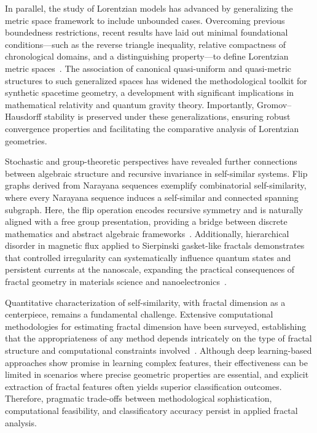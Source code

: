 \documentclass[sigconf]{acmart}
\begin{document}
In parallel, the study of Lorentzian models has advanced by generalizing the metric space framework to include unbounded cases. Overcoming previous boundedness restrictions, recent results have laid out minimal foundational conditions—such as the reverse triangle inequality, relative compactness of chronological domains, and a distinguishing property—to define Lorentzian metric spaces~\cite{ref51}. The association of canonical quasi-uniform and quasi-metric structures to such generalized spaces has widened the methodological toolkit for synthetic spacetime geometry, a development with significant implications in mathematical relativity and quantum gravity theory. Importantly, Gromov--Hausdorff stability is preserved under these generalizations, ensuring robust convergence properties and facilitating the comparative analysis of Lorentzian geometries.

Stochastic and group-theoretic perspectives have revealed further connections between algebraic structure and recursive invariance in self-similar systems. Flip graphs derived from Narayana sequences exemplify combinatorial self-similarity, where every Narayana sequence induces a self-similar and connected spanning subgraph. Here, the flip operation encodes recursive symmetry and is naturally aligned with a free group presentation, providing a bridge between discrete mathematics and abstract algebraic frameworks~\cite{ref56}. Additionally, hierarchical disorder in magnetic flux applied to Sierpinski gasket-like fractals demonstrates that controlled irregularity can systematically influence quantum states and persistent currents at the nanoscale, expanding the practical consequences of fractal geometry in materials science and nanoelectronics~\cite{ref37}.

Quantitative characterization of self-similarity, with fractal dimension as a centerpiece, remains a fundamental challenge. Extensive computational methodologies for estimating fractal dimension have been surveyed, establishing that the appropriateness of any method depends intricately on the type of fractal structure and computational constraints involved~\cite{ref30}. Although deep learning-based approaches show promise in learning complex features, their effectiveness can be limited in scenarios where precise geometric properties are essential, and explicit extraction of fractal features often yields superior classification outcomes. Therefore, pragmatic trade-offs between methodological sophistication, computational feasibility, and classificatory accuracy persist in applied fractal analysis.
\end{document}
